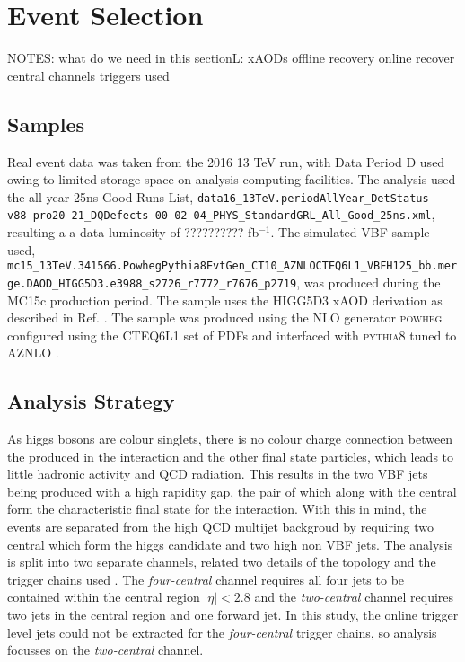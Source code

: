 \chapter{Event Selection}\label{c:ES}

NOTES:
what do we need in this sectionL:
	xAODs
	offline recovery 
	online recover
	central channels
	triggers used
	
	
	\section{Samples}
		 Real event data was taken from the 2016 13 TeV run, with Data Period D used owing to limited storage space on analysis computing facilities. The analysis used the all year 25ns Good Runs List, \verb|data16_13TeV.periodAllYear_DetStatus-v88-pro20-21_DQDefects-00-02-04_PHYS_StandardGRL_All_Good_25ns.xml|, resulting a a data luminosity of ?????????? fb$^{-1}$. The simulated VBF sample used, \verb|mc15_13TeV.341566.PowhegPythia8EvtGen_CT10_AZNLOCTEQ6L1_VBFH125_bb.merge.DAOD_HIGG5D3.e3988_s2726_r7772_r7676_p2719|, was produced during the MC15c production period. The sample uses the HIGG5D3 xAOD derivation as described in Ref. \cite{HIGG5D3}. The sample was produced using the NLO generator \textsc{powheg} configured using the CTEQ6L1 \cite{CTEQ} set of PDFs and interfaced with \textsc{pythia8} tuned to AZNLO \cite{AZNLO}.
		 
	\section{\VBFHBB Analysis Strategy} 
		As higgs bosons are colour singlets, there is no colour charge connection between the \bquarks produced in the interaction and the other final state particles, which leads to little hadronic activity and QCD radiation. This results in the two VBF jets being produced with a high rapidity gap, the pair of which along with the central \bjets form the characteristic final state for the interaction. With this in mind, the \VBFHBB events are separated from the high QCD multijet backgroud by requiring two central \bjets which form the higgs candidate and two high \pt non \btagged  VBF jets. The analysis is split into two separate channels, related two details of the topology and the trigger chains used . The \textit{four-central} channel requires all four jets to be contained within the central region $|\eta| < 2.8$ and the \textit{two-central} channel requires two jets in the central region and one forward jet. In this study, the online trigger level jets could not be extracted for the \textit{four-central} trigger chains, so analysis focusses on the \textit{two-central} channel. 
		
